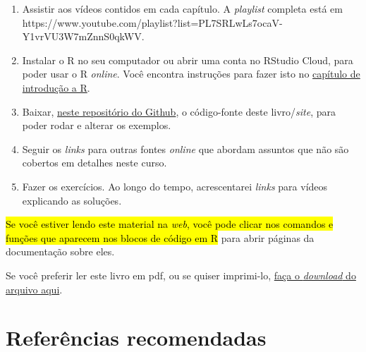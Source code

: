 \documentclass[
  letterpaper,
  DIV=11,
  numbers=noendperiod]{scrreprt}
\begin{document}
\begin{enumerate}
\def\labelenumi{\arabic{enumi}.}
\item
  Assistir aos vídeos contidos em cada capítulo. A \emph{playlist}
  completa está em
  https://www.youtube.com/playlist?list=PL7SRLwLs7ocaV-Y1vrVU3W7mZnnS0qkWV.
\item
  Instalar o R no seu computador ou abrir uma conta no RStudio Cloud,
  para poder usar o R \emph{online}. Você encontra instruções para fazer
  isto no \hyperref[rintro]{capítulo de introdução a R}.
\item
  Baixar, \href{https://github.com/fnaufel/probestr}{neste repositório
  do Github}, o código-fonte deste livro/\emph{site}, para poder rodar e
  alterar os exemplos.
\item
  Seguir os \emph{links} para outras fontes \emph{online} que abordam
  assuntos que não são cobertos em detalhes neste curso.
\item
  Fazer os exercícios. Ao longo do tempo, acrescentarei \emph{links}
  para vídeos explicando as soluções.
\end{enumerate}

\begin{tcolorbox}[enhanced jigsaw, coltitle=black, colbacktitle=quarto-callout-important-color!10!white, title=\textcolor{quarto-callout-important-color}{\faExclamation}\hspace{0.5em}{Importante}, toprule=.15mm, leftrule=.75mm, opacityback=0, colback=white, arc=.35mm, breakable, bottomtitle=1mm, left=2mm, toptitle=1mm, titlerule=0mm, rightrule=.15mm, bottomrule=.15mm, opacitybacktitle=0.6, colframe=quarto-callout-important-color-frame]

{\hl{Se você estiver lendo este material na \emph{web}, você pode clicar
nos comandos e funções que aparecem nos blocos de código em R}} para
abrir páginas da documentação sobre eles.

Se você preferir ler este livro em pdf, ou se quiser imprimi-lo,
\href{https://github.com/fnaufel/probestr/blob/master/docs/probestr.pdf}{faça
o \emph{download} do arquivo aqui}.

\end{tcolorbox}

\section*{Referências recomendadas}\label{refrec}

\end{document}
